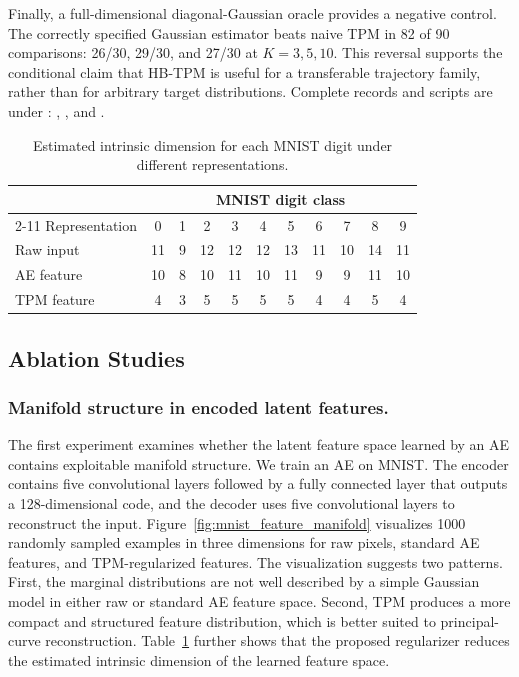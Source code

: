 \documentclass{article}
\begin{document}
Finally, a full-dimensional diagonal-Gaussian oracle provides a negative control. The correctly specified Gaussian estimator beats naive TPM in 82 of 90 comparisons: 26/30, 29/30, and 27/30 at $K=3,5,10$. This reversal supports the conditional claim that HB-TPM is useful for a transferable trajectory family, rather than for arbitrary target distributions. Complete records and scripts are under : , , and .

\begin{table}[H]
	\centering
	\caption{Estimated intrinsic dimension for each MNIST digit under different representations.}
	\label{table:dimension}
	\small
	\setlength{\tabcolsep}{7.5pt}
	\renewcommand{\arraystretch}{1.12}
	{
		\begin{tabular}{lcccccccccc}
			\toprule
			& \multicolumn{10}{c}{MNIST digit class} \\
			\cmidrule(lr){2-11}
			Representation & 0 & 1 & 2 & 3 & 4 & 5 & 6 & 7 & 8 & 9 \\
			\midrule
			Raw input & 11 & 9 & 12 & 12 & 12 & 13 & 11 & 10 & 14 & 11 \\
			AE feature & 10 & 8 & 10 & 11 & 10 & 11 & 9 & 9 & 11 & 10 \\
			TPM feature & 4 & 3 & 5 & 5 & 5 & 5 & 4 & 4 & 5 & 4 \\
			\bottomrule
		\end{tabular}
	}
\end{table}
\subsection{Ablation Studies}
\subsubsection{Manifold structure in encoded latent features.} The first experiment examines whether the latent feature space learned by an AE contains exploitable manifold structure. We train an AE on MNIST. The encoder contains five convolutional layers followed by a fully connected layer that outputs a 128-dimensional code, and the decoder uses five convolutional layers to reconstruct the input. Figure~\ref{fig:mnist_feature_manifold} visualizes 1000 randomly sampled examples in three dimensions for raw pixels, standard AE features, and TPM-regularized features. The visualization suggests two patterns. First, the marginal distributions are not well described by a simple Gaussian model in either raw or standard AE feature space. Second, TPM produces a more compact and structured feature distribution, which is better suited to principal-curve reconstruction. Table~\ref{table:dimension} further shows that the proposed regularizer reduces the estimated intrinsic dimension of the learned feature space.
\end{document}
